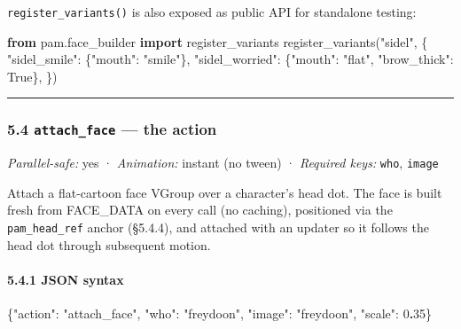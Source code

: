\documentclass[
  11pt,
]{book}
\newenvironment{Shaded}{}{}
\newcommand{\DataTypeTok}[1]{\textcolor[rgb]{0.56,0.13,0.00}{#1}}
\newcommand{\DecValTok}[1]{\textcolor[rgb]{0.25,0.63,0.44}{#1}}
\newcommand{\ErrorTok}[1]{\textcolor[rgb]{1.00,0.00,0.00}{\textbf{#1}}}
\newcommand{\FunctionTok}[1]{\textcolor[rgb]{0.02,0.16,0.49}{#1}}
\newcommand{\ImportTok}[1]{\textcolor[rgb]{0.00,0.50,0.00}{\textbf{#1}}}
\newcommand{\NormalTok}[1]{#1}
\newcommand{\StringTok}[1]{\textcolor[rgb]{0.25,0.44,0.63}{#1}}
\newcommand{\VariableTok}[1]{\textcolor[rgb]{0.10,0.09,0.49}{#1}}
\begin{document}
\texttt{register\_variants()} is also exposed as public API for
standalone testing:

\begin{Shaded}
\begin{Highlighting}[]
\ImportTok{from}\NormalTok{ pam.face\_builder }\ImportTok{import}\NormalTok{ register\_variants}
\NormalTok{register\_variants(}\StringTok{"sidel"}\NormalTok{, \{}
    \StringTok{"sidel\_smile"}\NormalTok{:   \{}\StringTok{"mouth"}\NormalTok{: }\StringTok{"smile"}\NormalTok{\},}
    \StringTok{"sidel\_worried"}\NormalTok{: \{}\StringTok{"mouth"}\NormalTok{: }\StringTok{"flat"}\NormalTok{, }\StringTok{"brow\_thick"}\NormalTok{: }\VariableTok{True}\NormalTok{\},}
\NormalTok{\})}
\end{Highlighting}
\end{Shaded}

\begin{center}\rule{0.5\linewidth}{0.5pt}\end{center}

\subsubsection{\texorpdfstring{5.4 \texttt{attach\_face} --- the
action}{5.4 attach\_face --- the action}}\label{attach_face-the-action}

\emph{Parallel-safe:} yes · \emph{Animation:} instant (no tween) ·
\emph{Required keys:} \texttt{who}, \texttt{image}

Attach a flat-cartoon face VGroup over a character's head dot. The face
is built fresh from FACE\_DATA on every call (no caching), positioned
via the \texttt{pam\_head\_ref} anchor (§5.4.4), and attached with an
updater so it follows the head dot through subsequent motion.

\paragraph{5.4.1 JSON syntax}\label{json-syntax}

\begin{Shaded}
\begin{Highlighting}[]
\FunctionTok{\{}\DataTypeTok{"action"}\FunctionTok{:} \StringTok{"attach\_face"}\FunctionTok{,} \DataTypeTok{"who"}\FunctionTok{:} \StringTok{"freydoon"}\FunctionTok{,}
 \DataTypeTok{"image"}\FunctionTok{:} \StringTok{"freydoon"}\FunctionTok{,} \DataTypeTok{"scale"}\FunctionTok{:} \DecValTok{0}\ErrorTok{.}\DecValTok{35}\FunctionTok{\}}
\end{Highlighting}
\end{Shaded}
\end{document}
